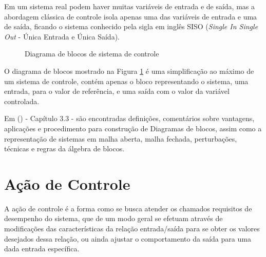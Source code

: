 Em um sistema real podem haver muitas variáveis de entrada e de saída, 
mas a abordagem clássica de controle isola apenas uma das variáveis de entrada e uma de saída, 
ficando o sistema conhecido pela sigla em inglês SISO (\emph{Single In Single Out} - Única Entrada e Única Saída).


\begin{figure}[!htb]
\centering
{}
\caption{ Diagrama de blocos de sistema de controle}
\label{fig:processo}
\end{figure}


O diagrama de blocos mostrado na Figura \ref{fig:processo} é uma simplificação ao máximo de um sistema de controle, 
contém apenas o bloco representando o sistema, 
uma entrada, para o valor de referência, 
e uma saída com o valor da variável controlada.


Em \citeauthor{Ogata}(\citeyear{Ogata}) - Capítulo 3.3 - 
são encontradas definições, 
comentários sobre vantagens, 
aplicações e procedimento para construção de Diagramas de blocos, 
assim como a representação de sistemas em malha aberta, 
malha fechada, 
perturbações, 
técnicas e regras da álgebra de blocos.





\section{Ação de Controle}



A ação de controle é a forma como se busca atender os chamados requisitos de desempenho do sistema, 
que de um modo geral se efetuam através de modificações das características da relação entrada/saída para se obter os valores desejados dessa relação, 
ou ainda ajustar o comportamento da saída para uma dada entrada específica.


